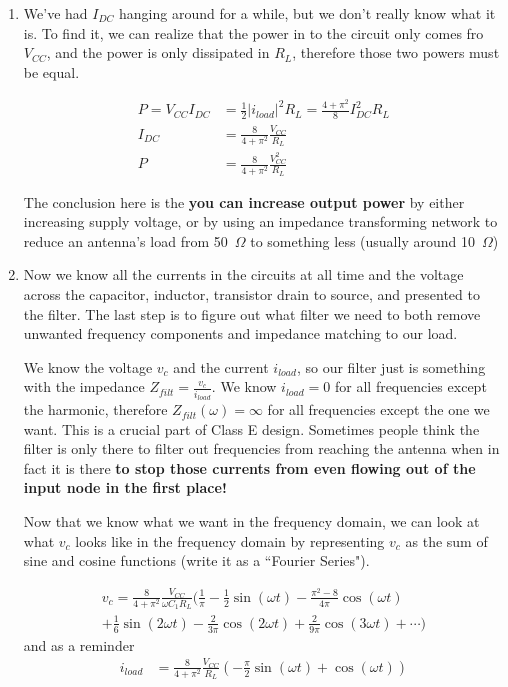 \documentclass[10pt,letterpaper]{article}
\begin{document}
\begin{enumerate}
\item We've had $I_{DC}$ hanging around for a while, but we don't really know what it is. To find it, we can realize that the power in to the circuit only comes fro $V_{CC}$, and the power is only dissipated in $R_L$, therefore those two powers must be equal.

\begin{align*}
P = V_{CC}I_{DC}&=\frac{1}{2}|i_{load}|^2 R_L=\frac{4+\pi^2}{8}I_{DC}^2 R_L\\
I_{DC}&=\frac{8}{4+\pi^2}\frac{V_{CC}}{R_L}\\
P&=\frac{8}{4+\pi^2}\frac{V_{CC}^2}{R_L}
\end{align*}

The conclusion here is the \textbf{you can increase output power} by either increasing supply voltage, or by using an impedance transforming network to reduce an antenna's load from 50~$\Omega$ to something less (usually around 10~$\Omega$)

\item Now we know all the currents in the circuits at all time and the voltage across the capacitor, inductor, transistor drain to source, and presented to the filter. The last step is to figure out what filter we need to both remove unwanted frequency components and impedance matching to our load.

We know the voltage $v_c$ and the current $i_{load}$, so our filter just is something with the impedance $Z_{filt}=\frac{v_c}{i_{load}}$. We know $i_{load}=0$ for all frequencies except the harmonic, therefore $Z_{filt}(\omega)=\infty$ for all frequencies except the one we want. This is a crucial part of Class E design. Sometimes people think the filter is only there to filter out frequencies from reaching the antenna when in fact it is there \textbf{to stop those currents from even flowing out of the input node in the first place!}

Now that we know what we want in the frequency domain, we can look at what $v_c$ looks like in the frequency domain by representing $v_c$ as the sum of sine and cosine functions (write it as a ``Fourier Series").

\begin{multline*}
v_c = \frac{8}{4+\pi^2}\frac{V_{CC}}{\omega C_1 R_L} \Big( \frac{1}{\pi}-\frac{1}{2}\sin(\omega t)-\frac{\pi^2-8}{4\pi}\cos(\omega t)\\
+\frac{1}{6}\sin(2\omega t)-\frac{2}{3\pi}\cos(2\omega t)+\frac{2}{9\pi}\cos(3\omega t)+\cdots \Big)
\end{multline*}
and as a reminder
\begin{align*}
i_{load}&=\frac{8}{4+\pi^2}\frac{V_{CC}}{R_L}\left( -\frac{\pi}{2}\sin(\omega t)+ \cos(\omega t)\right)
\end{align*}


\end{enumerate}
\end{document}
